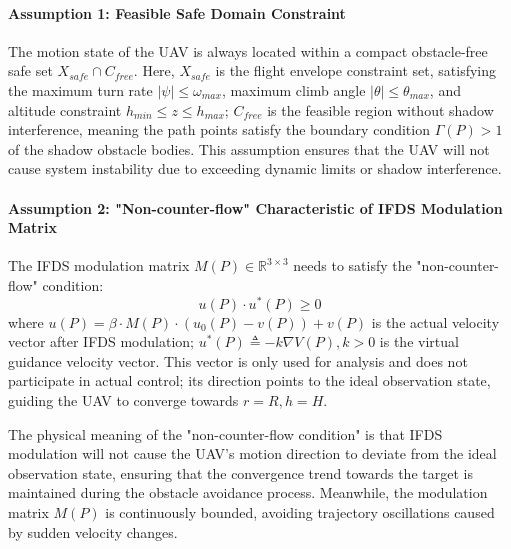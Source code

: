 \documentclass[final,3p,times,numbers]{elsarticle}
\begin{document}
\paragraph{Assumption 1: Feasible Safe Domain Constraint}
The motion state of the UAV is always located within a compact obstacle-free safe set $X_{safe} \cap C_{free}$. Here, $X_{safe}$ is the flight envelope constraint set, satisfying the maximum turn rate $|\psi| \le \omega_{max}$, maximum climb angle $|\theta| \le \theta_{max}$, and altitude constraint $h_{min} \le z \le h_{max}$; $C_{free}$ is the feasible region without shadow interference, meaning the path points satisfy the boundary condition $\Gamma(P) > 1$ of the shadow obstacle bodies. This assumption ensures that the UAV will not cause system instability due to exceeding dynamic limits or shadow interference.

\paragraph{Assumption 2: "Non-counter-flow" Characteristic of IFDS Modulation Matrix}
The IFDS modulation matrix $M(P) \in \mathbb{R}^{3 \times 3}$ needs to satisfy the "non-counter-flow" condition:
\begin{equation}
u(P) \cdot u^*(P) \ge 0 \label{eq:3-22}
\end{equation}
where $u(P) = \beta \cdot M(P) \cdot (u_0(P) - v(P)) + v(P)$ is the actual velocity vector after IFDS modulation; $u^*(P) \triangleq -k \nabla V(P), k>0$ is the virtual guidance velocity vector. This vector is only used for analysis and does not participate in actual control; its direction points to the ideal observation state, guiding the UAV to converge towards $r=R, h=H$.

The physical meaning of the "non-counter-flow condition" is that IFDS modulation will not cause the UAV's motion direction to deviate from the ideal observation state, ensuring that the convergence trend towards the target is maintained during the obstacle avoidance process. Meanwhile, the modulation matrix $M(P)$ is continuously bounded, avoiding trajectory oscillations caused by sudden velocity changes.
\end{document}
